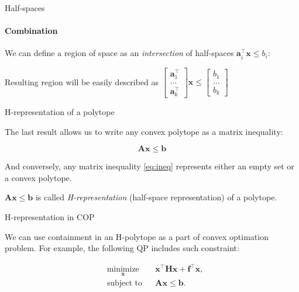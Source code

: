 \documentclass{beamer}
\begin{document}
\begin{frame}{Half-spaces}
\framesubtitle{Combination}
\begin{flushleft}

We can define a region of space as an \emph{intersection} of half-spaces $\mathbf{a}_i^\top \mathbf{x} \leq b_i$:



Resulting region will be easily described as $\begin{bmatrix} \mathbf{a}_1^\top \\ ... \\ \mathbf{a}_k^\top \end{bmatrix} \mathbf{x} \leq \begin{bmatrix} b_1 \\ ... \\ b_k \end{bmatrix}$

 
\end{flushleft}
\end{frame}


\begin{frame}{H-representation of a polytope}
\begin{flushleft}

The last result allows us to write any convex polytope as a matrix inequality:

\begin{equation}
\label{eq:ineq} 
    \mathbf{A} \mathbf{x} \leq  \mathbf{b} 
\end{equation}

And conversely, any matrix inequality \eqref{eq:ineq} represents either an empty set or a convex polytope.

\bigskip

\begin{definition}
 $\mathbf{A} \mathbf{x} \leq  \mathbf{b}$ is called \emph{H-representation} (half-space representation) of a polytope.
\end{definition}
 
\end{flushleft}
\end{frame}



\begin{frame}{H-representation in COP}
	\begin{flushleft}
		
		We can use containment in an H-polytope as a part of convex optimation problem. For example, the following QP includes such constraint:
		
		\begin{equation}
			\begin{aligned}
				& \underset{\mathbf{x}}{\text{minimize}}
				& & \mathbf{x}^\top \mathbf{H} \mathbf{x} + \mathbf{f}^\top\mathbf{x}, \\
				& \text{subject to}
				& & \mathbf{A}\mathbf{x} \leq \mathbf{b}.
			\end{aligned}
		\end{equation}
		
	\end{flushleft}
\end{frame}
\end{document}

